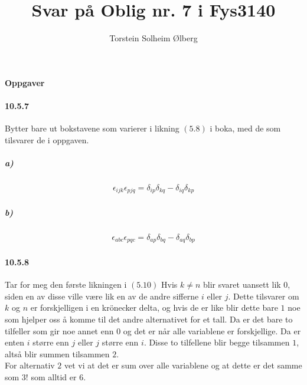 \documentclass[11pt, A4paper,norsk]{article}
\author{Torstein Solheim Ølberg}
\title{Svar på Oblig nr. 7 i Fys3140}
\begin{document}
\maketitle
	\begin{center}
\Large \textbf{Oppgaver}
	\end{center}








		\paragraph{10.5.7}
			\begin{flushleft}
Bytter bare ut bokstavene som varierer i likning $(5.8)$ i boka, med de som tilsvarer de i oppgaven.
			\end{flushleft}
			\subparagraph{a)}
				\begin{gather*}
\epsilon_{ijk} \epsilon_{pjq} = \delta_{ip} \delta_{kq} - \delta_{iq} \delta_{kp}
				\end{gather*}









			\subparagraph{b)}
				\begin{gather*}
\epsilon_{abc} \epsilon_{pqc} = \delta_{ap} \delta_{bq} - \delta_{aq} \delta_{bp}
				\end{gather*}








		\paragraph{10.5.8}
			\begin{flushleft}
Tar for meg den første likningen i $(5.10)$
Hvis $k \neq n$ blir svaret uansett lik $0$, siden en av disse ville være lik en av de andre sifferne $i$ eller $j$. Dette tilsvarer om $k$ og $n$ er forskjelligen i en krönecker delta, og hvis de er like blir dette bare $1$ noe som hjelper oss å komme til det andre alternativet for et tall. Da er det bare to tilfeller som gir noe annet enn $0$ og det er når alle variablene er forskjellige. Da er enten $i$ større enn $j$ eller $j$ større enn $i$. Disse to tilfellene blir begge tilsammen $1$, altså blir summen tilsammen $2$. \\
For alternativ $2$ vet vi at det er sum over alle variablene og at dette er det samme som $3!$ som alltid er $6$.
			\end{flushleft}
			
\end{document}
